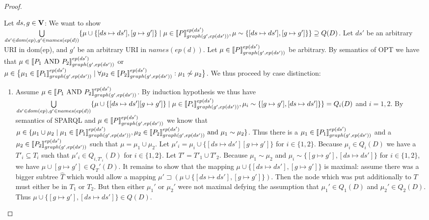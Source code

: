 \begin{proof}
\begin{enumerate}
			\bigskip\noindent
			Let $ds,g \in \mathbf{V}$:
			We want to show  $\bigcup\limits_{ds' \in dom(ep), g' \in names(ep(d))} \{ \mu \cup
			\{[ds \mapsto ds'],[g \mapsto g']\} \mid \mu \in
			\llbracket P\rrbracket^{ep(ds')}_{graph(g',ep(ds'))}, 
			\mu \sim \{[ds\mapsto ds'], [g \mapsto g']\}\} \supseteq Q(D) $. 
			Let $ds'$ be an arbitrary URI in dom(ep), and $g'$ be an arbitrary
			URI in $names(ep(d))$.
			Let $\mu \in \llbracket P \rrbracket^{ep(ds')}_{graph(g',ep(ds'))}$ be arbitrary.
			By semantics of OPT we have that $\mu \in \llbracket P_1 \mbox{ AND } P_2
			\rrbracket^{ep(ds')}_{graph(g',ep(ds'))}$ or \\
			$\mu \in \big\{ \mu_1 \in  \llbracket P_1 \rrbracket^{ep(ds')}_{graph(g',ep(ds'))} \mid \forall \mu_2 \in \llbracket P_2
				\rrbracket^{ep(ds')}_{graph(g',ep(ds'))}:
			\mu_1 \not\sim \mu_2 \big\}$. 
			We thus proceed by case distinction:
			\begin{enumerate}
				\item Assume $\mu \in \llbracket P_1 \mbox{ AND } P_2 \rrbracket^{ep(ds')}_{graph(g',ep(ds'))}$. 
					By induction hypothesis we thus have \\
					$\bigcup\limits_{ds'\in dom(ep),g' \in names(ep(d))} \{ \mu \cup \{[ds \mapsto
						ds'][g \mapsto g']\} \mid \mu \in
						\llbracket P_i\rrbracket^{ep(ds')}_{graph(g',ep(ds'))}, \mu_i \sim
					\{[g\mapsto g'], [ds \mapsto ds']\} \}  = Q_i(D) $ and $i = 1,2$.
					By semantics of SPARQL and $\mu \in \llbracket P
					\rrbracket^{ep(ds')}_{graph(g',ep(ds'))}$ we
					know that $\mu \in \{\mu_1 \cup \mu_2 \mid \mu_1 \in \llbracket P_1
						\rrbracket^{ep(ds')}_{graph(g',ep(ds'))}, \mu_2 \in \llbracket P_2
						\rrbracket^{ep(ds')}_{graph(g',ep(ds'))}
					\mbox{ and } \mu_1 \sim \mu_2 \}$. Thus there is a $\mu_1 \in \llbracket P_1
					\rrbracket^{ep(ds')}_{graph(g',ep(ds'))}$ and a $\mu_2 \in \llbracket P_2
					\rrbracket^{ep(ds')}_{graph(g',ep(ds'))}$ such that $\mu = \mu_1 \cup \mu_2$.
					Let $\mu'_i = \mu_i \cup \{ [ds \mapsto ds'][g \mapsto g']\}$ for $i \in
					\{1,2\}$.  Because $\mu_i \in Q_i(D)$  we have a
					$T'_i \subseteq T_i$ such that $\mu'_i \in Q_{i,T'_i}(D)$ for $i\in \{1,2\}$.
					Let $T' = T'_1 \cup T'_2$.
					Because $\mu_1 \sim \mu_2$ and $\mu_i \sim \{[g \mapsto
					g'],[ds \mapsto ds'] \}$ for
					$i\in\{1,2\}$, we have $\mu \cup [g	\mapsto g'] \in Q_T'(D)$.
					It remains to show that the mapping $\mu\cup \{[ds\mapsto
					ds'], [g\mapsto g'] \}$ is maximal: 
					assume there was a bigger subtree $\hat{T}$ which would allow a mapping 
					$\mu' \sqsupset (\mu\cup \{[ds \mapsto ds'],[g \mapsto g']\})$. Then the
					node which was put additionally to $T$ must either be in $T_1$ or $T_2$.
					But then either $\mu_1'$ or $\mu_2'$ were not maximal defying the assumption
					that $\mu_1' \in Q_1(D)$ and $\mu_2' \in Q_2(D)$.
					Thus $\mu \cup \{[g \mapsto g'],[ds \mapsto ds']\} \in Q(D)$. 



\end{enumerate}
\end{enumerate}
\end{proof}
